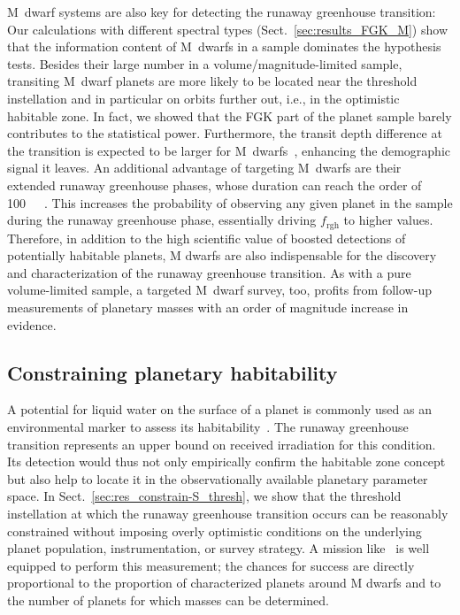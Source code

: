 \documentclass[twocolumn]{aastex631}
\begin{document}
M~dwarf systems are also key for detecting the runaway greenhouse transition:
Our calculations with different spectral types (Sect.~\ref{sec:results_FGK_M}) show that the information content of M~dwarfs in a sample dominates the hypothesis tests.
Besides their large number in a volume/magnitude-limited sample, transiting M~dwarf planets are more likely to be located near the threshold instellation and in particular on orbits further out, i.e., in the optimistic habitable zone.
In fact, we showed that the FGK part of the planet sample barely contributes to the statistical power.
Furthermore, the transit depth difference at the transition is expected to be larger for M~dwarfs~\citep[$\sim \SI{100}{\ppm}$ for early, $\sim \SI{1000}{\ppm}$ for late M~stars,][]{Turbet2019}, enhancing the demographic signal it leaves.
An additional advantage of targeting M~dwarfs are their extended runaway greenhouse phases, whose duration can reach the order of \SI{100}{\mega\year}~\citep{Luger2015}.
This increases the probability of observing any given planet in the sample during the runaway greenhouse phase, essentially driving $f_\mathrm{rgh}$ to higher values.
Therefore, in addition to the high scientific value of boosted detections of potentially habitable planets, M dwarfs are also indispensable for the discovery and characterization of the runaway greenhouse transition.
As with a pure volume-limited sample, a targeted M~dwarf survey, too, profits from follow-up measurements of planetary masses with an order of magnitude increase in evidence.


\subsection{Constraining planetary habitability}\label{sec:habitability}
A potential for liquid water on the surface of a planet is commonly used as an environmental marker to assess its habitability~\citep{Huang1959,Hart1978,Kasting1993,Kaltenegger2011,Kopparapu2013}.
The runaway greenhouse transition represents an upper bound on received irradiation for this condition.
Its detection would thus not only empirically confirm the habitable zone concept but also help to locate it in the observationally available planetary parameter space.
In Sect.~\ref{sec:res_constrain-S_thresh}, we show that the threshold instellation at which the runaway greenhouse transition occurs can be reasonably constrained without imposing overly optimistic conditions on the underlying planet population, instrumentation, or survey strategy.
A mission like \plato\ is well equipped to perform this measurement; the chances for success are directly proportional to the proportion of characterized planets around M dwarfs and to the number of planets for which masses can be determined.
\end{document}
